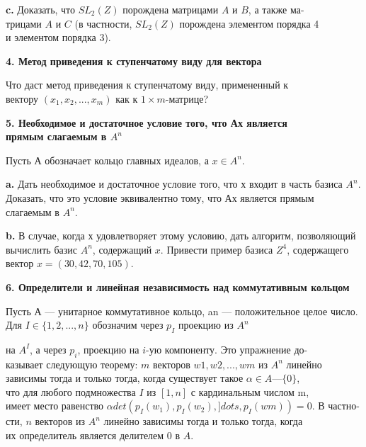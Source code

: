 \documentclass{../template/mai_book}
\begin{document}
\medskip

{\bf c.} Доказать, что $SL_2(\mathit{Z})$ порождена матрицами $A$ и $B$, а также 
ма-\\трицами $A$ и $C$ (в частности, $SL_2(\mathit{Z})$ порождена элементом порядка 4\\ 
и элементом порядка 3). 

\medskip

{\noindent\bf 4. Метод приведения к ступенчатому виду для вектора }

Что даст метод приведения к ступенчатому виду, примененный к\\ 
вектору $ (x_1,x_2,...,x_m) $ как к $1 \times m$-матрице? 

\medskip

{\noindent\bf 5. Необходимое и достаточное условие того, что Ах является \\
прямым слагаемым в $A^n$}

\medskip

Пусть А обозначает кольцо главных идеалов, а $x \in A^n  $.

\medskip

{\bf a.} Дать необходимое и достаточное условие того, что х входит в 
часть базиса $A^n$. Доказать, что это условие эквивалентно тому, что Ах 
является прямым слагаемым в $A^n$.

\medskip

{\bf b.} В случае, когда х удовлетворяет этому условию, дать алгоритм, 
позволяющий вычислить базис $A^n$, содержащий $x$. Привести пример 
базиса $\mathit{Z}^4$, содержащего вектор $x = (30,42,70,105)$. 

\medskip

{\noindent\bf 6. Определители и линейная независимость
над коммутативным кольцом }

\medskip

Пусть А — унитарное коммутативное кольцо, an — положительное 
целое число. Для $I \in \{1,2,..., n\}$ обозначим через $p_I$ проекцию из $A^n$

\pagebreak

\noindent на $A^I$, а через $p_i$, проекцию на $\mathit{i}$-ую компоненту. Это упражнение до-\\казывает следующую теорему: $m$ векторов $ w1, w2,..., wm$ из $A^n$ линейно\\ 
зависимы тогда и только тогда, когда существует такое $\alpha \in A — \{0\}$,\\ что для любого подмножества $I$ из $[1,n]$ с кардинальным числом m,\\ 
имеет место равенство $\alpha det(p_I(w_1),p_I(w_2),]dots ,p_I( wm)) = 0$. В 
частно-\\сти, $n$ векторов из $A^n$ линейно зависимы тогда и только тогда, когда\\ 
их определитель является делителем 0 в $A$.
\end{document}
